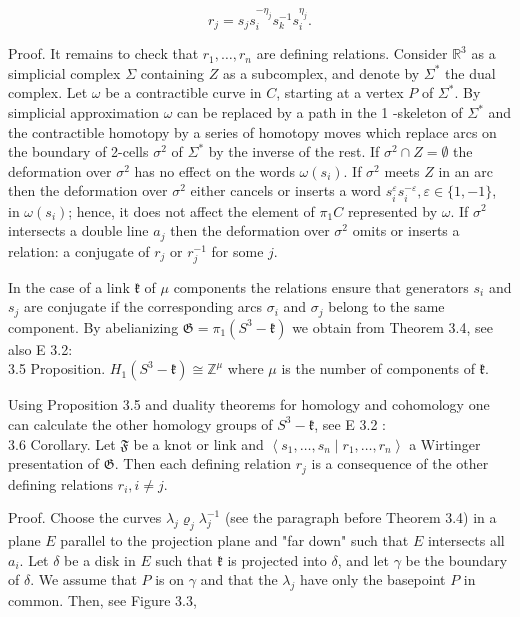 \documentclass[10pt, letterpaper]{article}
\begin{document}
$$
r_{j}=s_{j} s_{i}^{-\eta_{j}} s_{k}^{-1} s_{i}^{\eta_{j}} .
$$

Proof. It remains to check that $r_{1}, \ldots, r_{n}$ are defining relations. Consider $\mathbb{R}^{3}$ as a simplicial complex $\Sigma$ containing $Z$ as a subcomplex, and denote by $\Sigma^{*}$ the dual complex. Let $\omega$ be a contractible curve in $C$, starting at a vertex $P$ of $\Sigma^{*}$. By simplicial approximation $\omega$ can be replaced by a path in the 1 -skeleton of $\Sigma^{*}$ and the contractible homotopy by a series of homotopy moves which replace arcs on the boundary of 2-cells $\sigma^{2}$ of $\Sigma^{*}$ by the inverse of the rest. If $\sigma^{2} \cap Z=\emptyset$ the deformation over $\sigma^{2}$ has no effect on the words $\omega\left(s_{i}\right)$. If $\sigma^{2}$ meets $Z$ in an arc then the deformation over $\sigma^{2}$ either cancels or inserts a word $s_{i}^{\varepsilon} s_{i}^{-\varepsilon}, \varepsilon \in\{1,-1\}$, in $\omega\left(s_{i}\right)$; hence, it does not affect the element of $\pi_{1} C$ represented by $\omega$. If $\sigma^{2}$ intersects a double line $a_{j}$ then the deformation over $\sigma^{2}$ omits or inserts a relation: a conjugate of $r_{j}$ or $r_{j}^{-1}$ for some $j$.

In the case of a link $\mathfrak{k}$ of $\mu$ components the relations ensure that generators $s_{i}$ and $s_{j}$ are conjugate if the corresponding arcs $\sigma_{i}$ and $\sigma_{j}$ belong to the same component. By abelianizing $\mathfrak{G}=\pi_{1}\left(S^{3}-\mathfrak{k}\right)$ we obtain from Theorem 3.4, see also E 3.2:\\
3.5 Proposition. $H_{1}\left(S^{3}-\mathfrak{k}\right) \cong \mathbb{Z}^{\mu}$ where $\mu$ is the number of components of $\mathfrak{k}$.

Using Proposition 3.5 and duality theorems for homology and cohomology one can calculate the other homology groups of $S^{3}-\mathfrak{k}$, see E 3.2 :\\
3.6 Corollary. Let $\mathfrak{F}$ be a knot or link and $\left\langle s_{1}, \ldots, s_{n} \mid r_{1}, \ldots, r_{n}\right\rangle$ a Wirtinger presentation of $\mathfrak{G}$. Then each defining relation $r_{j}$ is a consequence of the other defining relations $r_{i}, i \neq j$.

Proof. Choose the curves $\lambda_{j} \varrho_{j} \lambda_{j}^{-1}$ (see the paragraph before Theorem 3.4) in a plane $E$ parallel to the projection plane and "far down" such that $E$ intersects all $a_{i}$. Let $\delta$ be a disk in $E$ such that $\mathfrak{k}$ is projected into $\delta$, and let $\gamma$ be the boundary of $\delta$. We assume that $P$ is on $\gamma$ and that the $\lambda_{j}$ have only the basepoint $P$ in common. Then, see Figure 3.3,
\end{document}
